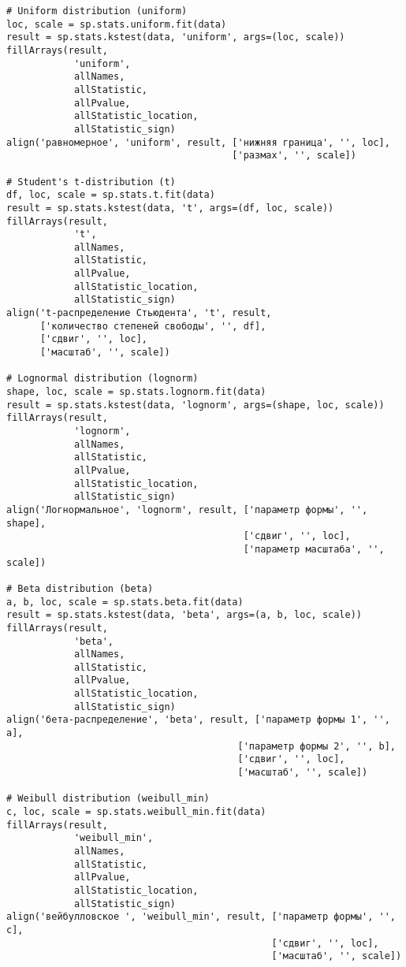 \documentclass[a4paper, 14pt]{extarticle}
\begin{document}
\begin{lstlisting}
# Uniform distribution (uniform)
loc, scale = sp.stats.uniform.fit(data)
result = sp.stats.kstest(data, 'uniform', args=(loc, scale))
fillArrays(result, 
            'uniform', 
            allNames, 
            allStatistic, 
            allPvalue, 
            allStatistic_location, 
            allStatistic_sign)
align('равномерное', 'uniform', result, ['нижняя граница', '', loc], 
                                        ['размах', '', scale])

# Student's t-distribution (t)
df, loc, scale = sp.stats.t.fit(data)
result = sp.stats.kstest(data, 't', args=(df, loc, scale))
fillArrays(result, 
            't', 
            allNames, 
            allStatistic, 
            allPvalue, 
            allStatistic_location, 
            allStatistic_sign)
align('t-распределение Стьюдента', 't', result, 
      ['количество степеней свободы', '', df], 
      ['сдвиг', '', loc],
      ['масштаб', '', scale])

# Lognormal distribution (lognorm)
shape, loc, scale = sp.stats.lognorm.fit(data)
result = sp.stats.kstest(data, 'lognorm', args=(shape, loc, scale))
fillArrays(result, 
            'lognorm', 
            allNames, 
            allStatistic, 
            allPvalue, 
            allStatistic_location, 
            allStatistic_sign)
align('Логнормальное', 'lognorm', result, ['параметр формы', '', shape], 
                                          ['сдвиг', '', loc],
                                          ['параметр масштаба', '', scale])

# Beta distribution (beta)
a, b, loc, scale = sp.stats.beta.fit(data)
result = sp.stats.kstest(data, 'beta', args=(a, b, loc, scale))
fillArrays(result, 
            'beta', 
            allNames, 
            allStatistic, 
            allPvalue, 
            allStatistic_location, 
            allStatistic_sign)
align('бета-распределение', 'beta', result, ['параметр формы 1', '', a], 
                                         ['параметр формы 2', '', b],
                                         ['сдвиг', '', loc],
                                         ['масштаб', '', scale])

# Weibull distribution (weibull_min)
c, loc, scale = sp.stats.weibull_min.fit(data)
fillArrays(result, 
            'weibull_min', 
            allNames, 
            allStatistic, 
            allPvalue, 
            allStatistic_location, 
            allStatistic_sign)
align('вейбулловское ', 'weibull_min', result, ['параметр формы', '', c], 
                                               ['сдвиг', '', loc],
                                               ['масштаб', '', scale])


\end{lstlisting}
\end{document}
